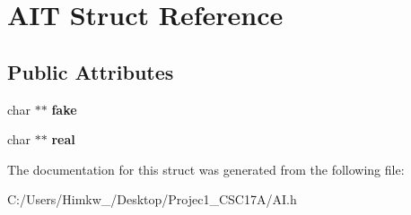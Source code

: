 \hypertarget{struct_a_i_t}{\section{A\+I\+T Struct Reference}
\label{struct_a_i_t}
}
\subsection*{Public Attributes}
\begin{DoxyCompactItemize}
\item 
\hypertarget{struct_a_i_t_abb6feee9f543ca047db0800dd3ddf9aa}{char $\ast$$\ast$ {\bfseries fake}}\label{struct_a_i_t_abb6feee9f543ca047db0800dd3ddf9aa}

\item 
\hypertarget{struct_a_i_t_a990c4a9c914870bf2f62c6ace9fb0a2b}{char $\ast$$\ast$ {\bfseries real}}\label{struct_a_i_t_a990c4a9c914870bf2f62c6ace9fb0a2b}

\end{DoxyCompactItemize}


The documentation for this struct was generated from the following file\+:\begin{DoxyCompactItemize}
\item 
C\+:/\+Users/\+Himkw\+\_/\+Desktop/\+Projec1\+\_\+\+C\+S\+C17\+A/A\+I.\+h\end{DoxyCompactItemize}
